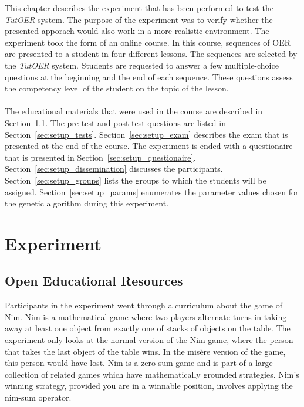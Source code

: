 This chapter describes the experiment that has been performed to test the
\emph{TutOER} system. The purpose of the experiment was to verify whether the
presented apporach would also work in a more realistic environment. The
experiment took the form of an online course. In this course, sequences of OER
are presented to a student in four different lessons. The sequences are
selected by the \emph{TutOER} system. Students are requested to answer a few
multiple-choice questions at the beginning and the end of each sequence. These
questions assess the competency level of the student on the topic of the
lesson.\\\\
\noindent
The educational materials that were used in the course are described in
Section~\ref{sec:setup_material}. The pre-test and post-test questions are
listed in Section~\ref{sec:setup_tests}. Section~\ref{sec:setup_exam} describes
the exam that is presented at the end of the course. The experiment is ended
with a questionaire that is presented in Section~\ref{sec:setup_questionaire}.
Section~\ref{sec:setup_dissemination} discusses the participants.
Section~\ref{sec:setup_groups} lists the groups to which the students will be
assigned. Section~\ref{sec:setup_params} enumerates the parameter values chosen
for the genetic algorithm during this experiment.
\section{Experiment}
\subsection{Open Educational Resources}
\label{sec:setup_material}
Participants in the experiment went through a curriculum about the game of Nim.
Nim is a mathematical game where two players alternate turns in taking away at
least one object from exactly one of stacks of objects on the table. The
experiment only looks at the normal version of the Nim game, where the person
that takes the last object of the table wins. In the mis\`{e}re version of the
game, this person would have lost. Nim is a zero-sum game and is part of a
large collection of related games which have mathematically grounded
strategies. Nim's winning strategy, provided you are in a winnable position,
involves applying the nim-sum operator. %

